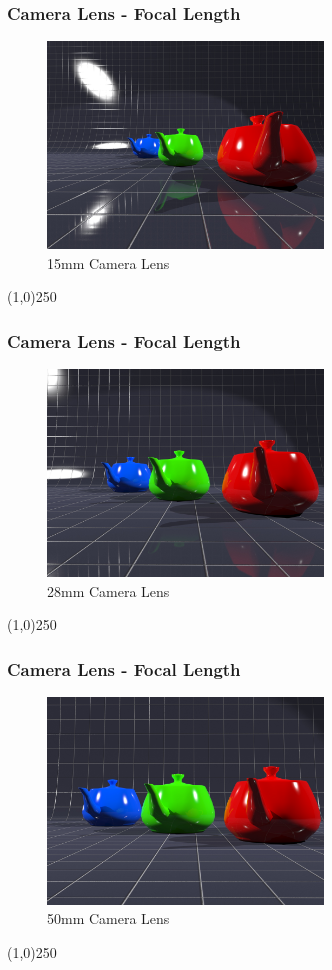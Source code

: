 \begin{frame}
\frametitle{Camera Lens - Focal Length}
\begin{figure}
	\centering
	\includegraphics[height=5.5cm]{img/Cameras/15mm.jpg}
	\caption[15mm Camera Lens]{15mm Camera Lens}
	\label{fig:15mm}
\end{figure}
\end{frame}
\begin{center}\line(1,0){250}\end{center}


\begin{frame}
\frametitle{Camera Lens - Focal Length}
\begin{figure}
	\centering
	\includegraphics[height=5.5cm]{img/Cameras/28mm.jpg}
	\caption[28mm Camera Lens]{28mm Camera Lens}
	\label{fig:28mm}
\end{figure}
\end{frame}
\begin{center}\line(1,0){250}\end{center}


\begin{frame}
\frametitle{Camera Lens - Focal Length}
\begin{figure}
	\centering
	\includegraphics[height=5.5cm]{img/Cameras/50mm.jpg}
	\caption[50mm Camera Lens]{50mm Camera Lens}
	\label{fig:50mm}
\end{figure}
\end{frame}
\begin{center}\line(1,0){250}\end{center}


